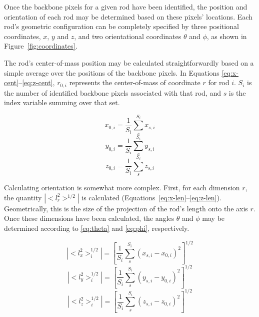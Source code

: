 
Once the backbone pixels for a given rod have been identified, the position and orientation of each rod may
be determined based on these pixels' locations.  Each rod's geometric configuration can be
completely specified by three positional coordinates, $x$, $y$ and $z$, and two
orientational coordinates $\theta$ and $\phi$, as shown in Figure~\ref{fig:coordinates}.

The rod's center-of-mass position may be calculated
straightforwardly based on a simple average over the positions of the backbone pixels.  In 
Equations \ref{eq:x-cent}--\ref{eq:z-cent}, $r_{0,i}$ represents the center-of-mass of coordinate $r$ for 
rod $i$.  $S_i$ is the number of identified backbone pixels associated with that rod, and $s$ is the index
variable summing over that set.

\begin{equation}
\label{eq:x-cent}
x_{0,i} = \frac{1}{S_i} \sum_{s}^{S_i} x_{s,i}
\end{equation}
\begin{equation}
\label{eq:y-cent}
y_{0,i} = \frac{1}{S_i} \sum_{s}^{S_i} y_{s,i}
\end{equation}
\begin{equation}
\label{eq:z-cent}
z_{0,i} = \frac{1}{S_i} \sum_{s}^{S_i} z_{s,i} 
\end{equation}

Calculating orientation is somewhat more complex.  First, for each dimension $r$, the quantity
$|<l_r^2>^{1/2}|$ is calculated (Equations~\ref{eq:x-len}--\ref{eq:z-len}). 
Geometrically, this is the size of the projection of the rod's length
onto the axis $r$.
Once these dimensions have been calculated, the angles $\theta$ and $\phi$ may be 
determined according to \ref{eq:theta} and \ref{eq:phi}, respectively.

\begin{equation}
\label{eq:x-len}
|<l_x^2>_i^{1/2}| = \left[\frac{1}{S_i} \sum_s^{S_i} (x_{s,i} - x_{0,i} )^2 \right]^{1/2}
\end{equation}
\begin{equation}
\label{eq:y-len}
|<l_y^2>_i^{1/2}| = \left[\frac{1}{S_i} \sum_s^{S_i} (y_{s,i} - y_{0,i} )^2 \right]^{1/2}
\end{equation}
\begin{equation}
\label{eq:z-len}
|<l_z^2>_i^{1/2}| = \left[\frac{1}{S_i} \sum_s^{S_i} (z_{s,i} - z_{0,i} )^2 \right]^{1/2}
\end{equation}

